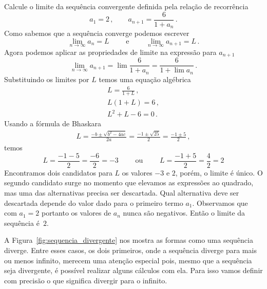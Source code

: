 \begin{example}
  Calcule o limite da sequência convergente definida pela relação de recorrência
  \[
    a_1 = 2  \,,
    \qquad
    a_{n+1} = \frac{6}{1+a_n}  \,.
  \]
\solution
  Como sabemos que a sequência converge podemos escrever
  \[
    \lim_{n\to\infty} a_n     = L \qquad \text{ e } \qquad
    \lim_{n\to\infty} a_{n+1} = L \,.
  \]
  Agora podemos aplicar as propriedades de limite na expressão para $a_{n+1}$
  \[
    \lim_{n\to\infty} a_{n+1} =
    \lim \frac{6}{1+a_n}  =
    \frac{6}{1+\lim a_n}  \,.
  \]
  Substituindo os limites por $L$ temos uma equação algébrica
  \begin{gather*}
  	L = \frac{6}{1+L} \,, \\[2mm]
  	L(1+L) = 6        \,, \\[2mm]
  	L^2 + L - 6  = 0  \,.
  \end{gather*}
  Usando a fórmula de Bhaskara
  \begin{gather*}
    L = \frac{-b\pm\sqrt{b^2 - 4ac}}{2a}
      = \frac{-1\pm\sqrt{25}}{2}
      = \frac{-1\pm 5}{2}  \,,
  \end{gather*}
  temos
  \[
    L = \frac{-1-5}{2} = \frac{-6}{2} = -3
    \qquad\text{ ou }\qquad
    L = \frac{-1+5}{2} = \frac{4}{2} = 2
  \]
  Encontramos dois candidatos para $L$ os valores $-3$ e $2$,
  porém, o limite é único. O segundo candidato surge no momento
  que elevamos as expressões ao quadrado, mas uma das alternativas
  precisa ser descartada. Qual alternativa deve ser descartada depende do
  valor dado para o primeiro termo $a_1$. Observamos que
  com $a_1=2$ portanto os valores de $a_n$
  nunca são negativos. Então o limite da sequência é~$2$.
\end{example}

A Figura~\ref{fig:sequencia_divergente} nos mostra as formas como uma sequência
diverge. Entre esses casos, os dois primeiros, onde a sequência diverge para
mais ou menos infinito, merecem uma atenção especial pois, mesmo que a
sequência seja divergente, é possível realizar alguns cálculos com ela.
Para isso vamos definir com precisão o que significa divergir para o infinito.

